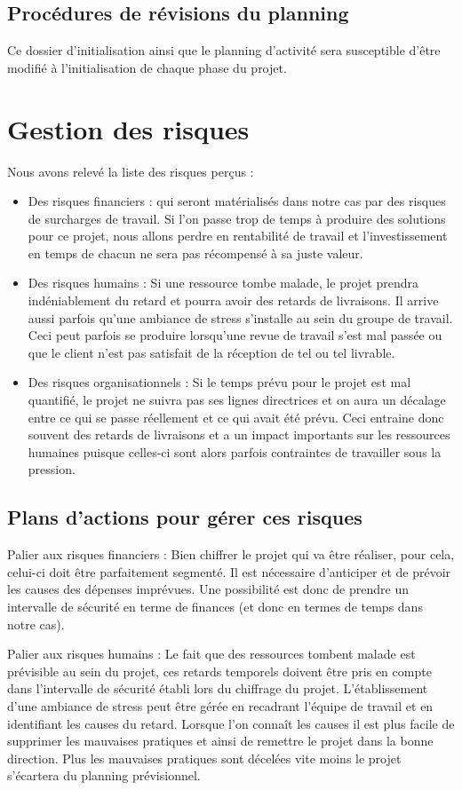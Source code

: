     \subsection{Procédures de révisions du planning}
Ce dossier d'initialisation ainsi que le planning d'activité sera susceptible d'être modifié à l'initialisation de chaque phase du projet.    
    \section{Gestion des risques}
Nous avons relevé la liste des risques perçus :
\begin{itemize}
\item Des risques financiers : qui seront matérialisés dans notre cas par des risques de surcharges de travail. Si l’on passe trop de temps à produire des solutions pour ce projet, nous allons perdre en rentabilité de travail et l’investissement en temps de chacun ne sera pas récompensé à sa juste valeur.
\item Des risques humains : Si une ressource tombe malade, le projet prendra indéniablement du retard et pourra avoir des retards de livraisons. Il arrive aussi parfois qu’une ambiance de stress s’installe au sein du groupe de travail. Ceci peut parfois se produire lorsqu’une revue de travail s’est mal passée ou que le client n’est pas satisfait de la réception de tel ou tel livrable.
\item Des risques organisationnels : Si le temps prévu pour le projet est mal quantifié, le projet ne suivra pas ses lignes directrices et on aura un décalage entre ce qui se passe réellement et ce qui avait été prévu. Ceci entraine donc souvent des retards de livraisons et a un impact importants sur les ressources humaines puisque celles-ci sont alors parfois contraintes de travailler sous la pression.
\end{itemize}

    \subsection{Plans d'actions pour gérer ces risques}
Palier aux risques financiers : Bien chiffrer le projet qui va être réaliser, pour cela, celui-ci doit être parfaitement segmenté. Il est nécessaire d’anticiper et de prévoir les causes des dépenses imprévues. Une possibilité est donc de prendre un intervalle de sécurité en terme de finances (et donc en termes de temps dans notre cas). 

Palier aux risques humains : Le fait que des ressources tombent malade est prévisible au sein du projet, ces retards temporels doivent être pris en compte dans l’intervalle de sécurité établi lors du chiffrage du projet. L’établissement d’une ambiance de stress peut être gérée en recadrant l’équipe de travail et en identifiant les causes du retard. Lorsque l’on connaît les causes il est plus facile de supprimer les mauvaises pratiques et ainsi de remettre le projet dans la bonne direction. Plus les mauvaises pratiques sont décelées vite moins le projet s’écartera du planning prévisionnel.   

